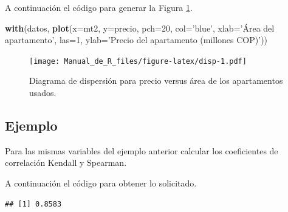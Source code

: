\documentclass[10pt,]{krantz}
\makeatletter
\newenvironment{Shaded}{\begin{snugshade}}{\end{snugshade}}
\newcommand{\KeywordTok}[1]{\textcolor[rgb]{0.13,0.29,0.53}{\textbf{{#1}}}}
\newcommand{\DataTypeTok}[1]{\textcolor[rgb]{0.13,0.29,0.53}{{#1}}}
\newcommand{\DecValTok}[1]{\textcolor[rgb]{0.00,0.00,0.81}{{#1}}}
\newcommand{\StringTok}[1]{\textcolor[rgb]{0.31,0.60,0.02}{{#1}}}
\newcommand{\NormalTok}[1]{{#1}}
\newenvironment{kframe}{%
\medskip{}
\setlength{\fboxsep}{.8em}
 \def\at@end@of@kframe{}%
 \ifinner\ifhmode%
  \def\at@end@of@kframe{\end{minipage}}%
  \begin{minipage}{\columnwidth}%
 \fi\fi%
 \def\FrameCommand##1{\hskip\@totalleftmargin \hskip-\fboxsep
 \colorbox{shadecolor}{##1}\hskip-\fboxsep
     \hskip-\linewidth \hskip-\@totalleftmargin \hskip\columnwidth}%
 \MakeFramed {\advance\hsize-\width
   \@totalleftmargin\z@ \linewidth\hsize
   \@setminipage}}%
 {\par\unskip\endMakeFramed%
 \at@end@of@kframe}
\renewenvironment{Shaded}{\begin{kframe}}{\end{kframe}}
\makeatother
\begin{document}
A continuación el código para generar la Figura \ref{fig:disp}.

\begin{Shaded}
\begin{Highlighting}[]
\KeywordTok{with}\NormalTok{(datos, }\KeywordTok{plot}\NormalTok{(}\DataTypeTok{x=}\NormalTok{mt2, }\DataTypeTok{y=}\NormalTok{precio, }\DataTypeTok{pch=}\DecValTok{20}\NormalTok{, }\DataTypeTok{col=}\StringTok{'blue'}\NormalTok{,}
                 \DataTypeTok{xlab=}\StringTok{'Área del apartamento'}\NormalTok{, }\DataTypeTok{las=}\DecValTok{1}\NormalTok{,}
                 \DataTypeTok{ylab=}\StringTok{'Precio del apartamento (millones COP)'}\NormalTok{))}
\end{Highlighting}
\end{Shaded}

\begin{figure}[htbp]
\centering
\texttt{[image: Manual\_de\_R\_files/figure-latex/disp-1.pdf]}
\caption{\label{fig:disp}Diagrama de dispersión para precio versus área de
los apartamentos usados.}
\end{figure}

\subsection*{Ejemplo}\label{ejemplo-39}


Para las mismas variables del ejemplo anterior calcular los coeficientes
de correlación Kendall y Spearman.

A continuación el código para obtener lo solicitado.

\begin{Shaded}
\end{Shaded}

\begin{verbatim}
## [1] 0.8583
\end{verbatim}

\begin{Shaded}
\end{Shaded}
\end{document}
